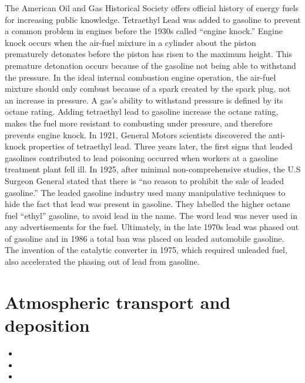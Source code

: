 \documentclass{article}\usepackage[]{graphicx}\usepackage[]{color}
\begin{document}
The American Oil and Gas Historical Society offers official history of energy fuels for increasing public knowledge. Tetraethyl Lead was added to gasoline to prevent a common problem in engines before the 1930s called “engine knock.” Engine knock occurs when the air-fuel mixture in a cylinder about the piston prematurely detonates before the piston has risen to the maximum height. This premature detonation occurs because of the gasoline not being able to withstand the pressure. In the ideal internal combustion engine operation, the air-fuel mixture should only combust because of a spark created by the spark plug, not an increase in pressure. A gas’s ability to withstand pressure is defined by its octane rating. Adding tetraethyl lead to gasoline increase the octane rating, makes the fuel more resistant to combusting under pressure, and therefore prevents engine knock. In 1921, General Motors scientists discovered the anti-knock properties of tetraethyl lead. Three years later, the first signs that leaded gasolines contributed to lead poisoning occurred when workers at a gasoline treatment plant fell ill. In 1925, after minimal non-comprehensive studies, the U.S Surgeon General stated that there is “no reason to prohibit the sale of leaded gasoline.” The leaded gasoline industry used many manipulative techniques to hide the fact that lead was present in gasoline. They labelled the higher octane fuel “ethyl” gasoline, to avoid lead in the name. The word lead was never used in any advertisements for the fuel. Ultimately, in the late 1970s lead was phased out of gasoline and in 1986 a total ban was placed on leaded automobile gasoline. The invention of the catalytic converter in 1975, which required unleaded fuel, also accelerated the phasing out of lead from gasoline. 

\bigskip



\section{Atmospheric transport and deposition}
\begin{itemize}
  \item {}
  \item {}
  \item {}
\end{itemize}
\end{document}
